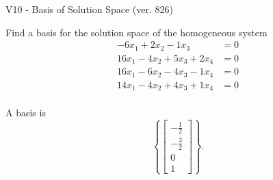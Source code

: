 \begin{exercise}
  \begin{exerciseTitle}V10 - Basis of Solution Space (ver. 826)\end{exerciseTitle}
  \begin{exerciseStatement}
    Find a basis for the solution space of the homogeneous system 
\begin{align*}
 -6 x_ 1 + 2 x_ 2 -1 x_ 3 &= 0  \\ 
  16 x_ 1 -4 x_ 2 + 5 x_ 3 + 2 x_ 4 &= 0  \\ 
  16 x_ 1 -6 x_ 2 -4 x_ 3 -1 x_ 4 &= 0  \\ 
  14 x_ 1 -4 x_ 2 + 4 x_ 3 + 1 x_ 4 &= 0  \\ 
 \end{align*}


 
  \end{exerciseStatement}

  \begin{exerciseAnswer}
   A basis is   
\[\left\{\left[\begin{array}{c}
-\frac{1}{2} \\
-\frac{3}{2} \\
0 \\
1
\end{array}\right]\right\}.\]

  


  \end{exerciseAnswer}
\end{exercise}